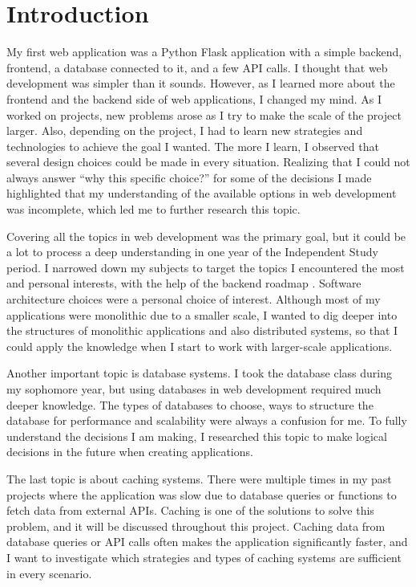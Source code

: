 \chapter{Introduction}\label{intro}

My first web application was a Python Flask application with a simple backend, frontend, a database connected to it, and a few API calls.
I thought that web development was simpler than it sounds. However, as I learned more about 
the frontend and the backend side of web applications, I changed my mind.
As I worked on projects, new problems arose as I try to make the scale of the project larger.
Also, depending on the project, I had to learn new strategies and technologies to achieve the goal I wanted.
The more I learn, I observed that several design choices could be made in every situation.
Realizing that I could not always answer “why this specific choice?” for some of the decisions I made highlighted that my understanding of the available options in web development was incomplete, which led me to further research this topic.

Covering all the topics in web development was the primary goal, but it could be a lot to process a deep understanding in one year of the Independent Study period. I narrowed down my subjects to target the topics I encountered the most and personal interests, with the help of the backend roadmap \cite{Ahmed_2025}. Software architecture choices were a personal choice of interest. Although most of my applications were monolithic due to a smaller scale, I wanted to dig deeper into the structures of monolithic applications and also distributed systems, so that I could apply the knowledge when I start to work with larger-scale applications.

Another important topic is database systems. I took the database class during my sophomore year, but using databases in web development required much deeper knowledge.
The types of databases to choose, ways to structure the database for performance and scalability were always a confusion for me.
To fully understand the decisions I am making, I researched this topic to make logical decisions in the future when creating applications.

The last topic is about caching systems.
There were multiple times in my past projects where the application was slow due to database queries or functions to fetch data from external APIs.
Caching is one of the solutions to solve this problem, and it will be discussed throughout this project.
Caching data from database queries or API calls often makes the application significantly faster, 
and I want to investigate which strategies and types of caching systems are sufficient in every scenario. 

